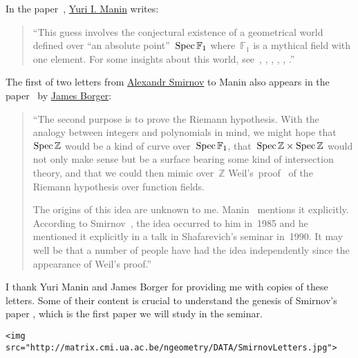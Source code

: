 In the paper~\cite{the-notion-of-dimension-in-geometry-and-algebra}, \href{http://en.wikipedia.org/wiki/Yuri_I._Manin}{Yuri I. Manin} writes:

\begin{quote}
  ``This guess involves the conjectural existence of a geometrical world defined over ``an absolute point''~$\operatorname{Spec}\mathbb{F}_1$ where~$\mathbb{F}_1$ is a mythical field with one element. For some insights about this world, see~\cite{sur-les-analogues-algebriques-des-groupes-semi-simples-complexes}, \cite{hurwitz-inequalities-for-number-fields}, \cite{letters-to-manin}, \cite{cohomology-determinants-and-reciprocity-laws}, \cite{three-dimensional-hyperbolic-geometry}, \cite{les-varietes-sur-le-corps-a-un-element}.''
\end{quote}

The first of two letters from \href{http://www.pdmi.ras.ru/eng/perso/smirnov.php}{Alexandr Smirnov} to Manin also appears in the paper~\cite{lambda-rings-and-the-field-with-one-element} by \href{http://maths.anu.edu.au/~borger/}{James Borger}:

\begin{quote}
  ``The second purpose is to prove the Riemann hypothesis. With the analogy between integers and polynomials in mind, we might hope that~$\operatorname{Spec}\mathbb{Z}$ would be a kind of curve over~$\operatorname{Spec}\mathbb{F}_1$, that~$\operatorname{Spec}\mathbb{Z}\times\operatorname{Spec}\mathbb{Z}$ would not only make sense but be a surface bearing some kind of intersection theory, and that we could then mimic over~$\mathbb{Z}$ Weil's~proof~\cite{on-the-riemann-hypothesis-in-function-fields} of the Riemann hypothesis over function fields.
  
  The origins of this idea are unknown to me. Manin~\cite{lectures-on-zeta-functions-and-motives} mentions it explicitly. According to Smirnov~\cite{letters-to-manin}, the idea occurred to him in~1985 and he mentioned it explicitly in a talk in Shafarevich's seminar in~1990. It may well be that a number of people have had the idea independently since the appearance of Weil's proof.''
\end{quote}

I thank Yuri Manin and James Borger for providing me with copies of these letters. Some of their content is crucial to understand the genesis of Smirnov's paper \cite{hurwitz-inequalities-for-number-fields}, which is the first paper we will study in the seminar.

\verb|<img src="http://matrix.cmi.ua.ac.be/ngeometry/DATA/SmirnovLetters.jpg">|

